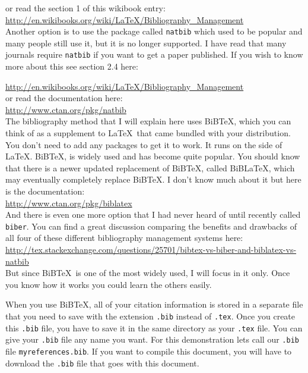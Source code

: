 \documentclass{article}
\newcommand{\nid}{\noindent} %
\newcommand{\myrefs}{\texttt{myreferences.bib}}
\begin{document}
\nid or read the section 1 of this wikibook entry:\\

\nid\url{http://en.wikibooks.org/wiki/LaTeX/Bibliography_Management}\\

\nid Another option is to use the package called \texttt{natbib} which used to be popular and many people still use it, but it is no longer supported.  I have read that many journals require \texttt{natbib} if you want to get a paper published.  If you wish to know more about this see section 2.4 here:

\nid\url{http://en.wikibooks.org/wiki/LaTeX/Bibliography_Management}\\

\nid or read the documentation here:\\
\nid\url{http://www.ctan.org/pkg/natbib}\\

The bibliography method that I will explain here uses BiB\TeX, which you can think of as a supplement to \LaTeX\ that came bundled with your distribution.  You don't need to add any packages to get it to work.  It runs on the side of \LaTeX.  BiB\TeX, is widely used and has become quite popular.  You should know that there is a newer updated replacement of BiB\TeX, called BiB\LaTeX,  which may eventually completely replace BiB\TeX.  I don't know much about it but here is the documentation:\\

\nid \url{http://www.ctan.org/pkg/biblatex}\\

\nid And there is even one more option that I had never heard of until recently called \texttt{biber}.  You can find a great discussion comparing the benefits and drawbacks of all four of these different bibliography management systems here:\\

\nid\url{http://tex.stackexchange.com/questions/25701/bibtex-vs-biber-and-biblatex-vs-natbib}\\

But since BiB\TeX\ is one of the most widely used, I will focus in it only.  Once you know how it works you could learn the others easily.

When you use BiB\TeX, all of your citation information is stored in a separate file that you need to save with the extension \verb|.bib| instead of \verb|.tex|.  Once you create this \verb|.bib| file, you have to save it in the same directory as your \verb|.tex| file. You can give your \verb|.bib| file any name you want.  For this demonstration lets call our \verb|.bib| file \myrefs.  If you want to compile this document, you will have to download the \verb|.bib| file that goes with this document.
\end{document}

